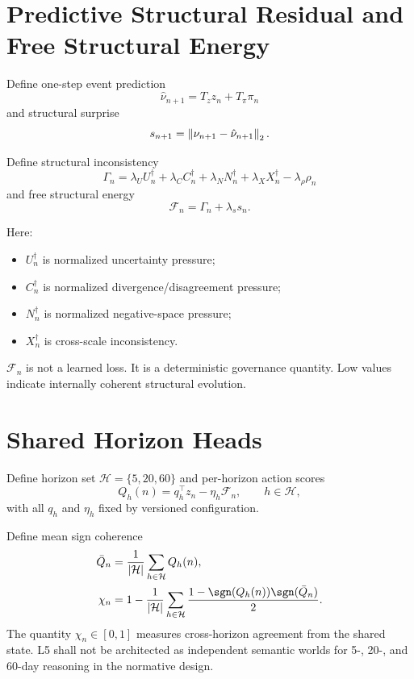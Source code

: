 \section{Predictive Structural Residual and Free Structural Energy}

Define one-step event prediction
\[
\hat \nu_{n+1} = T_z z_n + T_\pi \pi_n
\]
and structural surprise
\[
s_{n+1} = \left\lVert \nu_{n+1}-\hat \nu_{n+1} \right\rVert_2.
\]

Define structural inconsistency
\[
\Gamma_n = \lambda_U U_n^{\dagger} + \lambda_C C_n^{\dagger} + \lambda_N N_n^{\dagger} + \lambda_X X_n^{\dagger} - \lambda_\rho \rho_n
\]
and free structural energy
\[
\mathcal{F}_n = \Gamma_n + \lambda_s s_n.
\]

Here:
\begin{itemize}
    \item $U_n^{\dagger}$ is normalized uncertainty pressure;
    \item $C_n^{\dagger}$ is normalized divergence/disagreement pressure;
    \item $N_n^{\dagger}$ is normalized negative-space pressure;
    \item $X_n^{\dagger}$ is cross-scale inconsistency.
\end{itemize}

$\mathcal{F}_n$ is not a learned loss. It is a deterministic governance quantity. Low values indicate internally coherent structural evolution.

\section{Shared Horizon Heads}

Define horizon set $\mathcal{H}=\{5,20,60\}$ and per-horizon action scores
\[
Q_h(n)=q_h^{\top}z_n - \eta_h\mathcal{F}_n,\qquad h\in\mathcal{H},
\]
with all $q_h$ and $\eta_h$ fixed by versioned configuration.

Define mean sign coherence
\begin{align*}
\bar Q_n &= \frac{1}{|\mathcal{H}|}\sum_{h\in\mathcal{H}}Q_h(n),\\
\chi_n &= 1-\frac{1}{|\mathcal{H}|}\sum_{h\in\mathcal{H}}\frac{1-\sgn(Q_h(n))\sgn(\bar Q_n)}{2}.
\end{align*}
The quantity $\chi_n\in[0,1]$ measures cross-horizon agreement from the shared state. L5 shall not be architected as independent semantic worlds for 5-, 20-, and 60-day reasoning in the normative design.


